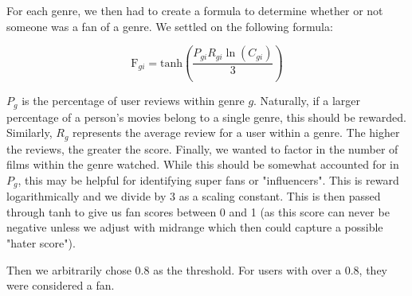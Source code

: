 \documentclass[12pt]{article}
\numberwithin{equation}{section}
\begin{document}
For each genre, we then had to create a formula to determine whether or not someone was a fan of a genre. We settled on the following formula:

\[
\text{F}_{gi}= \text{tanh}\left(\frac{P_{gi} R_{gi}\ln(C_{gi})}{3}\right)
\]

$P_g$ is the percentage of user reviews within genre $g$. Naturally, if a larger percentage of a person's movies belong to a single genre, this should be rewarded. Similarly, $R_g$ represents the average review for a user within a genre. The higher the reviews, the greater the score. Finally, we wanted to factor in the number of films within the genre watched. While this should be somewhat accounted for in $P_g$, this may be helpful for identifying super fans or "influencers". This is reward logarithmically and we divide by 3 as a scaling constant.
This is then passed through tanh to give us fan scores between 0 and 1 (as this score can never be negative unless we adjust with midrange which then could capture a possible "hater score").

Then we arbitrarily chose 0.8 as the threshold. For users with over a 0.8, they were considered a fan. 
\end{document}
